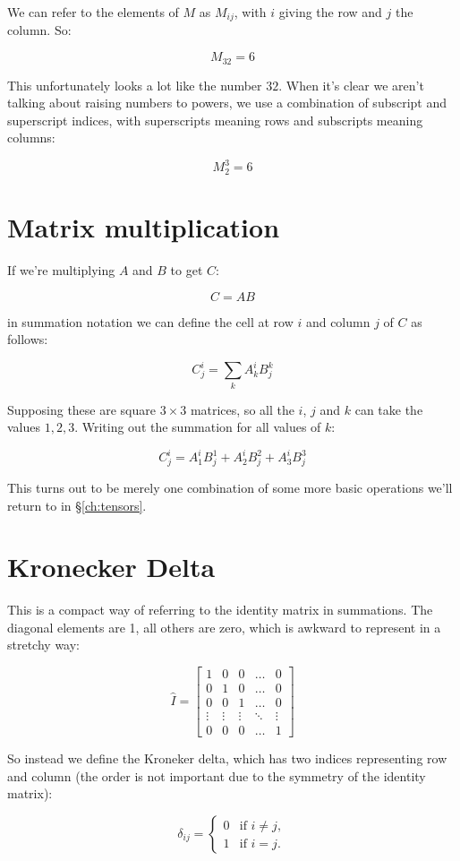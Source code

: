 We can refer to the elements of $M$ as $M_{ij}$, with $i$ giving the row and $j$ the column. So:

$$M_{32} = 6$$

This unfortunately looks a lot like the number $32$. When it's clear we aren't talking about raising numbers to powers, we use a combination of subscript and superscript indices, with superscripts meaning rows and subscripts meaning columns:

$$M^3_2 = 6$$

\section{Matrix multiplication}

If we're multiplying $A$ and $B$ to get $C$:

$$C = AB$$

in summation notation we can define the cell at row $i$ and column $j$ of $C$ as follows:

$$C^i_j = \sum_k{A^i_kB^k_j}$$

Supposing these are square $3 \times 3$ matrices, so all the $i$, $j$ and $k$ can take the values $1, 2, 3$. Writing out the summation for all values of $k$:

$$C^i_j = A^i_1B^1_j + A^i_2B^2_j + A^i_3B^3_j $$

This turns out to be merely one combination of some more basic operations we'll return to in §\ref{ch:tensors}.

\section{Kronecker Delta} \label{def:kronecker}

This is a compact way of referring to the identity matrix in summations. The diagonal elements are 1, all others are zero, which is awkward to represent in a stretchy way:

$$
\hat{I} = \begin{bmatrix}
1 & 0 & 0 & \dots & 0 \\
0 & 1 & 0 & \dots & 0 \\
0 & 0 & 1 & \dots & 0 \\
\vdots & \vdots & \vdots & \ddots & \vdots\\
0 & 0 & 0 & \dots & 1
\end{bmatrix}
$$

So instead we define the Kroneker delta, which has two indices representing row and column (the order is not important due to the symmetry of the identity matrix):

$$
\delta_{ij} = \begin{cases}
0 &\text{if } i \neq j,   \\
1 &\text{if } i=j.   \end{cases}
$$


